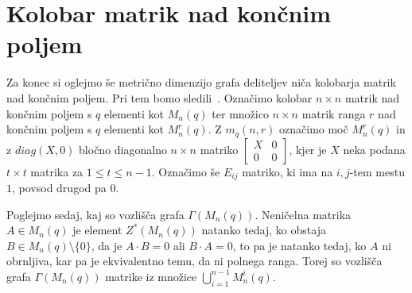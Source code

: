 \documentclass[mat1, tisk]{fmfdelo}
\newcommand{\N}{\mathbb N}
\begin{document}
\section{Kolobar matrik nad končnim poljem}
Za konec si oglejmo še metrično dimenzijo grafa deliteljev niča kolobarja matrik nad 
končnim poljem. Pri tem bomo sledili~\cite{0OuSh}. 
Označimo  
kolobar $n \times n$ matrik nad končnim poljem s $q$ elementi kot $M_n(q)$ ter  
množico $n \times n$ matrik ranga $r$ nad končnim poljem s $q$ elementi kot ${M}_n^r(q)$. Z $m_q(n,r)$  
označimo moč $M_n^r(q)$ in z $diag(X, 0)$ bločno diagonalno $n \times n$ matriko 
$\begin{bmatrix}
  X & 0 \\
  0 & 0
\end{bmatrix}$, kjer je $X$ neka podana $t \times t$ matrika za $1 \leq t \leq n-1$. 
Označimo še $E_{ij}$ matriko, ki ima na $i,j$-tem mestu $1$, povsod drugod pa $0$.

Poglejmo sedaj, kaj so vozlišča grafa $\Gamma(M_n(q))$. 
Neničelna matrika $A\in M_n(q)$ je element $Z^*(M_n(q))$ natanko tedaj, ko obstaja 
$B \in M_n(q)\setminus\{0\}$, da je $A \cdot B = 0$ ali $B \cdot A = 0$, to pa je natanko tedaj, ko $A$ 
ni obrnljiva, kar pa je ekvivalentno temu, da ni polnega ranga. Torej so vozlišča grafa $\Gamma(M_n(q))$ 
matrike iz množice $\bigcup\limits_{i=1}^{n-1} M_n^i(q)$.
\end{document}

